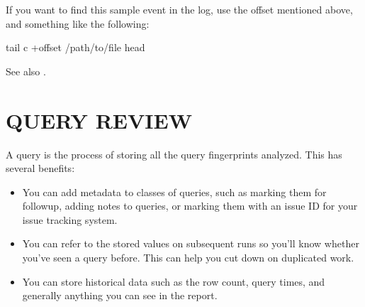 \documentclass[letterpaper,10pt,english]{sphinxmanual}
\begin{document}
If you want to find this sample event in the log, use the offset mentioned
above, and something like the following:

\begin{sphinxVerbatim}[commandchars=\\\{\}]
tail \PYGZhy{}c +\PYGZlt{}offset\PYGZgt{} /path/to/file  head
\end{sphinxVerbatim}

See also {\hyperref[\detokenize{mariadb-query-digest:cmdoption-mariadb-query-digest-report-format}]{}}.


\section{QUERY REVIEW}
\label{\detokenize{mariadb-query-digest:query-review}}
A query {\hyperref[\detokenize{mariadb-query-digest:cmdoption-mariadb-query-digest-review}]{}} is the process of storing all the query fingerprints
analyzed.  This has several benefits:
\begin{itemize}
\item {} 
You can add metadata to classes of queries, such as marking them for follow\sphinxhyphen{}up,
adding notes to queries, or marking them with an issue ID for your issue
tracking system.

\item {} 
You can refer to the stored values on subsequent runs so you’ll know whether
you’ve seen a query before.  This can help you cut down on duplicated work.

\item {} 
You can store historical data such as the row count, query times, and generally
anything you can see in the report.

\end{itemize}
\end{document}
